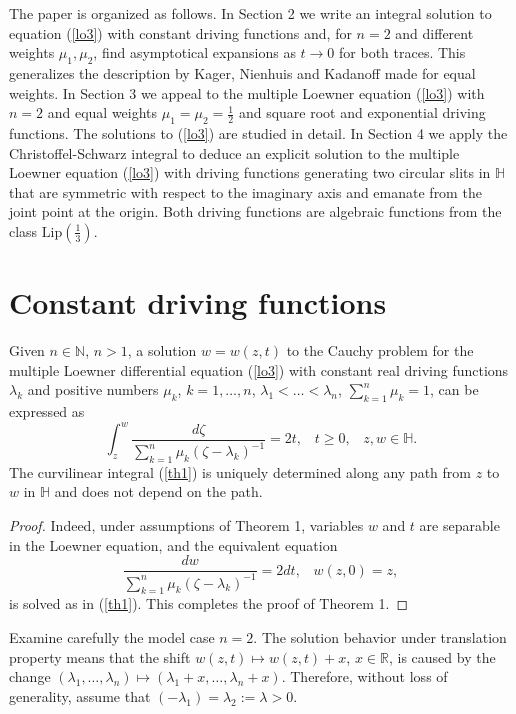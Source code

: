 \documentclass[
11pt,%
tightenlines,%
twoside,%
onecolumn,%
nofloats,%
nobibnotes,%
nofootinbib,%
superscriptaddress,%
noshowpacs,%
centertags]%
{revtex4}
\begin{document}
The paper is organized as follows. In Section 2 we write an integral solution to equation (\ref{lo3}) with constant driving functions and, for $n=2$ and different weights $\mu_1,\mu_2$, find asymptotical expansions as $t\to0$ for both traces. This generalizes the description by Kager, Nienhuis and Kadanoff \cite{KagNieKad} made for equal weights. In Section 3 we appeal to the multiple Loewner equation (\ref{lo3}) with $n=2$ and equal weights $\mu_1=\mu_2=\frac{1}{2}$ and square root and exponential driving functions. The solutions to (\ref{lo3}) are studied in detail. In Section 4 we apply the Christoffel-Schwarz integral to deduce an explicit solution to the multiple Loewner equation (\ref{lo3}) with driving functions generating two circular slits in $\mathbb H$ that are symmetric with respect to the imaginary axis and emanate from the joint point at the origin. Both driving functions are algebraic functions from the class $\text{Lip}(\frac{1}{3})$.

\section{Constant driving functions}

\begin{theorem}
Given $n\in\mathbb N$, $n>1$, a solution $w=w(z,t)$ to the Cauchy problem for the multiple Loewner differential equation (\ref{lo3}) with constant real driving functions $\lambda_k$ and positive numbers $\mu_k$, $k=1,\dots,n$, $\lambda_1<\dots<\lambda_n$, $\sum_{k=1}^n\mu_k=1$, can be expressed as
\begin{equation}
\int_z^w\frac{d\zeta}{\sum_{k=1}^n\mu_k(\zeta-\lambda_k)^{-1}}=2t,\;\;\;t\geq0,\;\;\;z,w\in\mathbb H. \label{th1}
\end{equation}
The curvilinear integral (\ref{th1}) is uniquely determined along any path from $z$ to $w$ in $\mathbb H$ and does not depend on the path.
\end{theorem}

\begin{proof}
Indeed, under assumptions of Theorem 1, variables $w$ and $t$ are separable in the Loewner equation, and the equivalent equation $$\frac{dw}{\sum_{k=1}^n\mu_k(\zeta-\lambda_k)^{-1}}=2dt,\;\;\;w(z,0)=z,$$ is solved as in (\ref{th1}). This completes the proof of Theorem 1.
\end{proof}

Examine carefully the model case $n=2$. The solution behavior under translation property means that the shift $w(z,t)\mapsto w(z,t)+x$, $x\in\mathbb R$, is caused by the change $(\lambda_1,\dots,\lambda_n)\mapsto(\lambda_1+x,\dots,\lambda_n+x)$. Therefore, without loss of generality, assume that $(-\lambda_1)=\lambda_2:=\lambda>0$.
\end{document}
